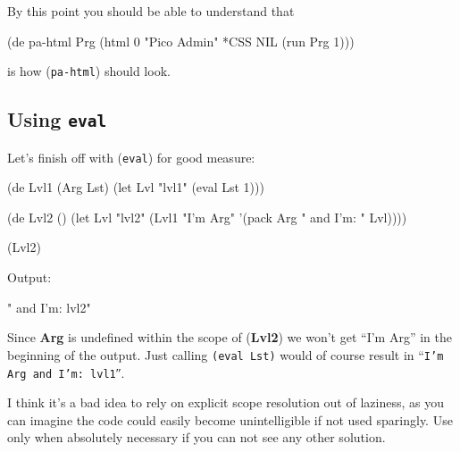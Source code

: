 By this point you should be able to understand that


\begin{wideverbatim}
(de pa-html Prg
  (html 0 "Pico Admin" *CSS NIL (run Prg 1)))
\end{wideverbatim}

is how (\texttt{pa-html}) should look.


\subsection{Using \texttt{eval}}
\label{sec:expl-scope-res-using-eval}

Let's finish off with (\texttt{eval}) for good measure:

\begin{wideverbatim}
(de Lvl1 (Arg Lst)
  (let Lvl "lvl1"
     (eval Lst 1)))
  
(de Lvl2 ()
  (let Lvl "lvl2"
     (Lvl1 "I'm Arg" '(pack Arg " and I'm: " Lvl))))
  
(Lvl2)
\end{wideverbatim}

Output:

\begin{wideverbatim}
" and I'm: lvl2"
\end{wideverbatim}

Since \textbf{Arg} is undefined within the scope of (\textbf{Lvl2}) we
won't get ``I'm Arg'' in the beginning of the output. Just calling
\texttt{(eval Lst)} would of course result in “\texttt{I'm Arg and
  I'm: lvl1}″.

I think it's a bad idea to rely on explicit scope resolution out of
laziness, as you can imagine the code could easily become unintelligible
if not used sparingly. Use only when absolutely necessary if you can not
see any other solution.

